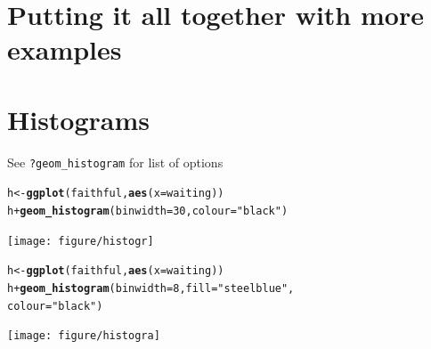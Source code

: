 \documentclass{beamer}\usepackage[]{graphicx}\usepackage[]{color}
\makeatletter
\newcommand{\hlnum}[1]{\textcolor[rgb]{0.686,0.059,0.569}{#1}}%
\newcommand{\hlstr}[1]{\textcolor[rgb]{0.192,0.494,0.8}{#1}}%
\newcommand{\hlopt}[1]{\textcolor[rgb]{0,0,0}{#1}}%
\newcommand{\hlstd}[1]{\textcolor[rgb]{0.345,0.345,0.345}{#1}}%
\newcommand{\hlkwb}[1]{\textcolor[rgb]{0.69,0.353,0.396}{#1}}%
\newcommand{\hlkwc}[1]{\textcolor[rgb]{0.333,0.667,0.333}{#1}}%
\newcommand{\hlkwd}[1]{\textcolor[rgb]{0.737,0.353,0.396}{\textbf{#1}}}%
\newenvironment{kframe}{%
 \def\at@end@of@kframe{}%
 \ifinner\ifhmode%
  \def\at@end@of@kframe{\end{minipage}}%
  \begin{minipage}{\columnwidth}%
 \fi\fi%
 \def\FrameCommand##1{\hskip\@totalleftmargin \hskip-\fboxsep
 \colorbox{shadecolor}{##1}\hskip-\fboxsep
     \hskip-\linewidth \hskip-\@totalleftmargin \hskip\columnwidth}%
 \MakeFramed {\advance\hsize-\width
   \@totalleftmargin\z@ \linewidth\hsize
   \@setminipage}}%
 {\par\unskip\endMakeFramed%
 \at@end@of@kframe}
\newenvironment{knitrout}{}{} %
\makeatother
\begin{document}

\section*{Putting it all together with more examples}
\frame{\sectionpage}


\section*{Histograms}
\frame{\sectionpage}


\begin{frame}[fragile]
See \texttt{?geom\_histogram} for list of options
\begin{knitrout}\footnotesize
{}\color{fgcolor}\begin{kframe}
\begin{alltt}
\hlstd{h} \hlkwb{<-} \hlkwd{ggplot}\hlstd{(faithful,} \hlkwd{aes}\hlstd{(}\hlkwc{x} \hlstd{= waiting))}
\hlstd{h} \hlopt{+} \hlkwd{geom_histogram}\hlstd{(}\hlkwc{binwidth} \hlstd{=} \hlnum{30}\hlstd{,} \hlkwc{colour} \hlstd{=} \hlstr{"black"}\hlstd{)}
\end{alltt}
\end{kframe}

{\centering \texttt{[image: figure/histogr]} 

}



\end{knitrout}
\end{frame}


\begin{frame}[fragile]
\begin{knitrout}\footnotesize
{}\color{fgcolor}\begin{kframe}
\begin{alltt}
\hlstd{h} \hlkwb{<-} \hlkwd{ggplot}\hlstd{(faithful,} \hlkwd{aes}\hlstd{(}\hlkwc{x} \hlstd{= waiting))}
\hlstd{h} \hlopt{+} \hlkwd{geom_histogram}\hlstd{(}\hlkwc{binwidth} \hlstd{=} \hlnum{8}\hlstd{,} \hlkwc{fill} \hlstd{=} \hlstr{"steelblue"}\hlstd{,}
\hlkwc{colour} \hlstd{=} \hlstr{"black"}\hlstd{)}
\end{alltt}
\end{kframe}

{\centering \texttt{[image: figure/histogra]} 

}



\end{knitrout}
\end{frame}
\end{document}
